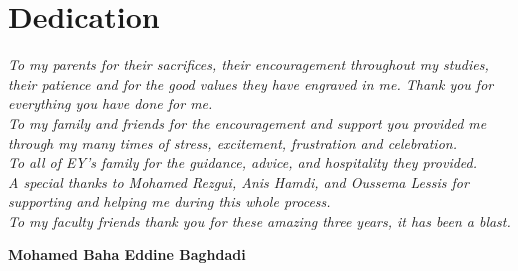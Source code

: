 \chapter{Dedication}
\vskip2.5cm
\thispagestyle{empty}
\begin{center}
 \emph{
 To my parents for their sacrifices, their encouragement throughout my studies, their patience and for the good values they have engraved in me. Thank you for everything you have done for me.\\To my family and friends for the encouragement and support you provided me through my many times of stress, excitement, frustration and celebration.\\To all of EY's family for the guidance, advice, and hospitality they provided. \\A special thanks to Mohamed Rezgui, Anis Hamdi, and Oussema Lessis for supporting and helping me during this whole process.\\To my faculty friends thank you for these amazing three years, it has been a blast.
 }
\vskip1cm

\hfill \textbf{Mohamed Baha Eddine Baghdadi\\}
\end{center}